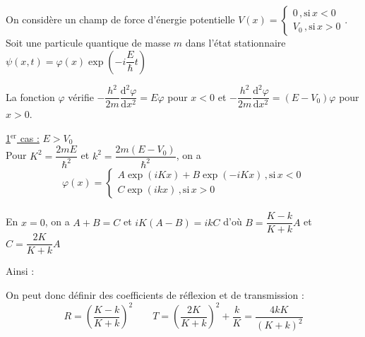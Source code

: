 \documentclass[a4paper]{article}
\begin{document}
\pagestyle{fancy}
\fancyhf{}
\setlength{\headheight}{15pt}

\begin{center}
	\large{}
\end{center}


On considère un champ de force d'énergie potentielle \( V(x) = \left\{ \begin{array}{l} 0\,,\mathrm{si}\,x < 0 \\ V_0 \,,\mathrm{si}\,x > 0 \end{array}\right. \).\\
Soit une particule quantique de masse \( m \) dans l'état stationnaire \( \psi(x,t) = \varphi(x)\exp( - i \dfrac{E}{\hbar}t) \)
\par

La fonction \( \varphi \) vérifie \( - \dfrac{h^2}{2m}\dfrac{\mathrm{d}^2\varphi}{\mathrm{d}x^2} = E\varphi \) pour \( x < 0 \) et \( - \dfrac{h^2}{2m}\dfrac{\mathrm{d}^2\varphi}{\mathrm{d}x^2} = (E - V_0)\varphi \) pour \( x > 0 \).
\par

\underline{1$^{\mathrm{er}}$ cas :} \( E > V_0 \)\\
Pour \( K^2 = \dfrac{2mE}{\hbar^2} \) et \( k^2 = \dfrac{2m(E - V_0)}{\hbar^2}  \), on a \[ \varphi(x) = \left\{\begin{array}{l} A\exp(iKx) + B\exp( - iKx)\,,\mathrm{si}\,x < 0 \\ C\exp(ikx)\,,\mathrm{si}\,x > 0 \end{array}\right. \]\\
En \( x = 0 \), on a \( A + B = C \) et \( iK(A - B) = ikC \) d'où \( B = \dfrac{K - k}{K + k}A \) et \( C = \dfrac{2K}{K + k}A \)

Ainsi :
\begin{center}\end{center}
On peut donc définir des coefficients de réflexion et de transmission : \[ R = \left( \dfrac{K - k}{K + k}  \right)^2 \qquad T = \left( \dfrac{2K}{K + k}  \right)^2 + \dfrac{k}{K} = \dfrac{4kK}{(K + k)^2} \]
\par
\end{document}
